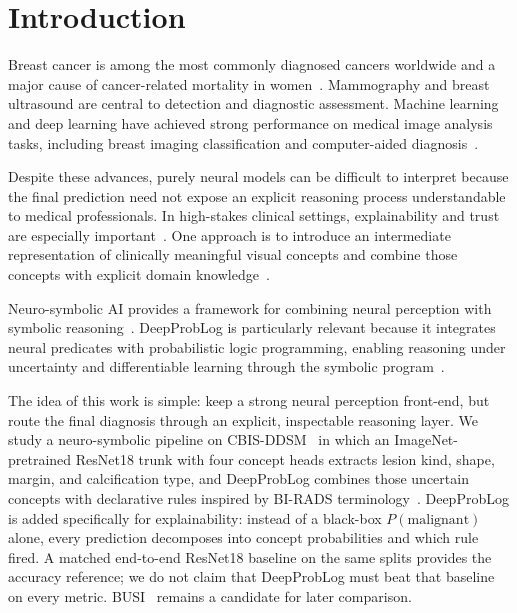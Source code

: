 \section{Introduction}
\label{sec:introduction}

Breast cancer is among the most commonly diagnosed cancers worldwide and a major cause of cancer-related mortality in women~\cite{sung2021global}. Mammography and breast ultrasound are central to detection and diagnostic assessment. Machine learning and deep learning have achieved strong performance on medical image analysis tasks, including breast imaging classification and computer-aided diagnosis~\cite{litjens2017survey,balkenende2022application}.

Despite these advances, purely neural models can be difficult to interpret because the final prediction need not expose an explicit reasoning process understandable to medical professionals. In high-stakes clinical settings, explainability and trust are especially important~\cite{rudin2019stop,vandervelden2022xai}. One approach is to introduce an intermediate representation of clinically meaningful visual concepts and combine those concepts with explicit domain knowledge~\cite{koh2020concept}.

Neuro-symbolic AI provides a framework for combining neural perception with symbolic reasoning~\cite{garcez2002neural,garcez2023neurosymbolic}. DeepProbLog is particularly relevant because it integrates neural predicates with probabilistic logic programming, enabling reasoning under uncertainty and differentiable learning through the symbolic program~\cite{manhaeve2018deepproblog,manhaeve2021neural}.

The idea of this work is simple: keep a strong neural perception front-end, but route the final diagnosis through an explicit, inspectable reasoning layer. We study a neuro-symbolic pipeline on CBIS-DDSM~\cite{lee2017cbis} in which an ImageNet-pretrained ResNet18 trunk with four concept heads extracts lesion kind, shape, margin, and calcification type, and DeepProbLog combines those uncertain concepts with declarative rules inspired by BI-RADS terminology~\cite{acr2013birads}. DeepProbLog is added specifically for explainability: instead of a black-box $P(\mathrm{malignant})$ alone, every prediction decomposes into concept probabilities and which rule fired. A matched end-to-end ResNet18 baseline on the same splits provides the accuracy reference; we do not claim that DeepProbLog must beat that baseline on every metric. BUSI~\cite{aldhabyani2020busi} remains a candidate for later comparison.

